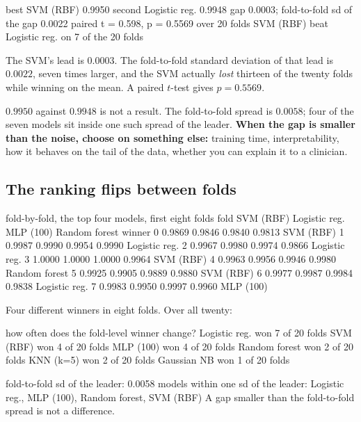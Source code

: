 \documentclass[11pt]{article}
\begin{document}
\begin{codeout}
best   SVM (RBF)        0.9950
second Logistic reg.    0.9948
gap 0.0003;  fold-to-fold sd of the gap 0.0022
paired t = 0.598, p = 0.5569 over 20 folds
SVM (RBF) beat Logistic reg. on 7 of the 20 folds
\end{codeout}

The SVM's lead is $0.0003$. The fold-to-fold standard deviation of that lead is
$0.0022$, seven times larger, and the SVM actually \emph{lost} thirteen of the
twenty folds while winning on the mean. A paired $t$-test gives $p = 0.5569$.

\begin{keyidea}
$0.9950$ against $0.9948$ is not a result. The fold-to-fold spread is
$0.0058$; four of the seven models sit inside one such spread of the leader.
\textbf{When the gap is smaller than the noise, choose on something else:}
training time, interpretability, how it behaves on the tail of the data, whether
you can explain it to a clinician.
\end{keyidea}

\subsection{The ranking flips between folds}

\begin{codeout}
fold-by-fold, the top four models, first eight folds
fold  SVM (RBF)      Logistic reg.  MLP (100)      Random forest  winner
  0   0.9869         0.9846         0.9840         0.9813         SVM (RBF)
  1   0.9987         0.9990         0.9954         0.9990         Logistic reg.
  2   0.9967         0.9980         0.9974         0.9866         Logistic reg.
  3   1.0000         1.0000         1.0000         0.9964         SVM (RBF)
  4   0.9963         0.9956         0.9946         0.9980         Random forest
  5   0.9925         0.9905         0.9889         0.9880         SVM (RBF)
  6   0.9977         0.9987         0.9984         0.9838         Logistic reg.
  7   0.9983         0.9950         0.9997         0.9960         MLP (100)
\end{codeout}

Four different winners in eight folds. Over all twenty:

\begin{codeout}
how often does the fold-level winner change?
  Logistic reg.    won  7 of 20 folds
  SVM (RBF)        won  4 of 20 folds
  MLP (100)        won  4 of 20 folds
  Random forest    won  2 of 20 folds
  KNN (k=5)        won  2 of 20 folds
  Gaussian NB      won  1 of 20 folds

fold-to-fold sd of the leader: 0.0058
models within one sd of the leader: Logistic reg., MLP (100), Random forest, SVM (RBF)
A gap smaller than the fold-to-fold spread is not a difference.
\end{codeout}
\end{document}
